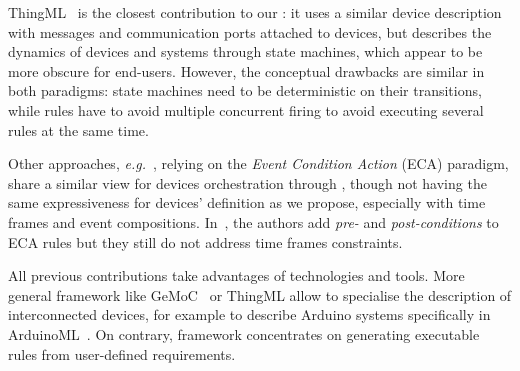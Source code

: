 ThingML~\cite{harrand-16} is the closest contribution to our \DSL: it uses a similar device description with messages and communication ports attached to devices, but describes the dynamics of devices and systems through state machines, which appear to be more obscure for end-users. However, the conceptual drawbacks are similar in both paradigms: state machines need to be deterministic on their transitions, while rules have to avoid multiple concurrent firing to avoid executing several rules at the same time. 

Other approaches, \textit{e.g.}~\cite{bhandari-13,cheng-16}, relying on the \textit{Event Condition Action} (ECA) paradigm, share a similar view for \IOT devices orchestration through \CEP, though not having the same expressiveness for devices' definition as we propose, especially with time frames and event compositions. In~\cite{shimokura-07}, the authors add \textit{pre-} and \textit{post-conditions} to ECA rules but they still do not address time frames constraints.

All previous contributions take advantages of \MDE technologies and tools. More general \MDE framework like GeMoC~\cite{bousse-16} or ThingML allow to specialise the description of interconnected devices, for example to describe Arduino systems specifically in ArduinoML~\cite{mosser-14}. On contrary, \IOTDSL framework concentrates on generating executable rules from user-defined requirements.